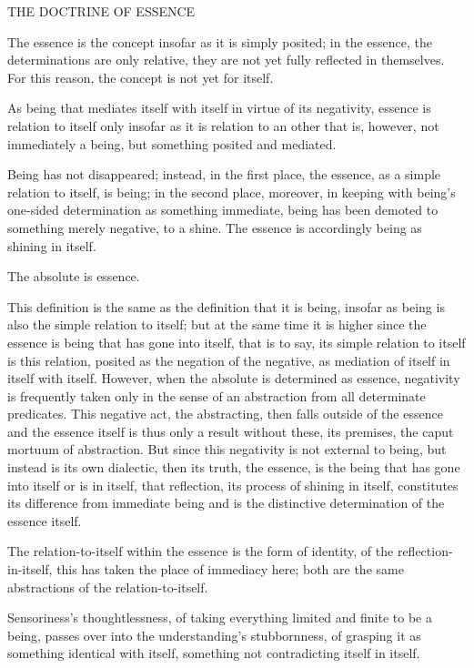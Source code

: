 THE DOCTRINE OF ESSENCE

The essence is the concept insofar as it is simply posited;
in the essence, the determinations are only relative,
they are not yet fully reflected in themselves.
For this reason, the concept is not yet for itself.

As being that mediates itself with itself in virtue of its negativity,
essence is relation to itself only insofar as
it is relation to an other that is, however, not immediately a being,
but something posited and mediated.

Being has not disappeared;
instead, in the first place,
the essence, as a simple relation to itself, is being;
in the second place, moreover,
in keeping with being's one-sided determination as something immediate,
being has been demoted to something merely negative, to a shine.
The essence is accordingly being as shining in itself.

    The absolute is essence.

    This definition is the same as the definition that it is being,
    insofar as being is also the simple relation to itself;
    but at the same time it is higher since the essence is
    being that has gone into itself, that is to say,
    its simple relation to itself is this relation,
    posited as the negation of the negative,
    as mediation of itself in itself with itself.
    However, when the absolute is determined as essence,
    negativity is frequently taken only in the sense of
    an abstraction from all determinate predicates.
    This negative act, the abstracting, then falls outside of the essence and
    the essence itself is thus only a result without these, its premises,
    the caput mortuum of abstraction.
    But since this negativity is not external to being,
    but instead is its own dialectic,
    then its truth, the essence,
    is the being that has gone into itself or is in itself,
    that reflection, its process of shining in itself,
    constitutes its difference from immediate being and
    is the distinctive determination of the essence itself.

The relation-to-itself within the essence is the form of identity,
of the reflection-in-itself, this has taken the place of immediacy here;
both are the same abstractions of the relation-to-itself.

    Sensoriness's thoughtlessness,
    of taking everything limited and finite to be a being,
    passes over into the understanding's stubbornness,
    of grasping it as something identical with itself,
    something not contradicting itself in itself.

